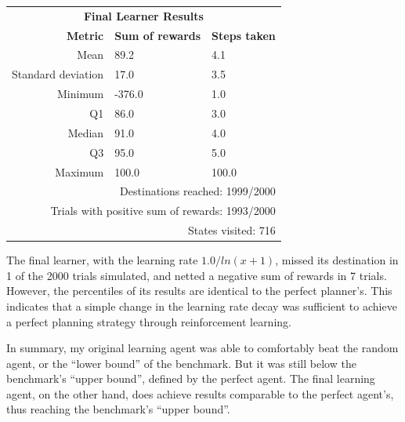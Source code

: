 \documentclass{article}
\begin{document}
\begin{center}
   \begin{tabular}{rll}
        \multicolumn{3}{c}{\textbf{Final Learner Results}} \\
        \textbf{Metric}     & \textbf{Sum of rewards}   & \textbf{Steps taken}\\
        Mean                & 89.2                      & 4.1\\
        Standard deviation  & 17.0                      & 3.5\\
        Minimum             & -376.0                    & 1.0\\
        Q1                  & 86.0                      & 3.0\\
        Median              & 91.0                      & 4.0\\
        Q3                  & 95.0                      & 5.0\\
        Maximum             & 100.0                     & 100.0\\
        \multicolumn{3}{r}{Destinations reached: 1999/2000}\\
        \multicolumn{3}{r}{Trials with positive sum of rewards: 1993/2000}\\
        \multicolumn{3}{r}{States visited: 716}\\
    \end{tabular}
\end{center}

The final learner, with the learning rate $1.0 / ln(x + 1)$, missed its destination in 1 of the 2000 trials simulated, and netted a negative sum of rewards in 7 trials. However, the percentiles of its results are identical to the perfect planner's. This indicates that a simple change in the learning rate decay was sufficient to achieve a perfect planning strategy through reinforcement learning.

In summary, my original learning agent was able to comfortably beat the random agent, or the ``lower bound'' of the benchmark. But it was still below the benchmark's ``upper bound'', defined by the perfect agent. The final learning agent, on the other hand, does achieve results comparable to the perfect agent's, thus reaching the benchmark's ``upper bound''.


\renewcommand{\arraystretch}{1.25}
\end{document}
